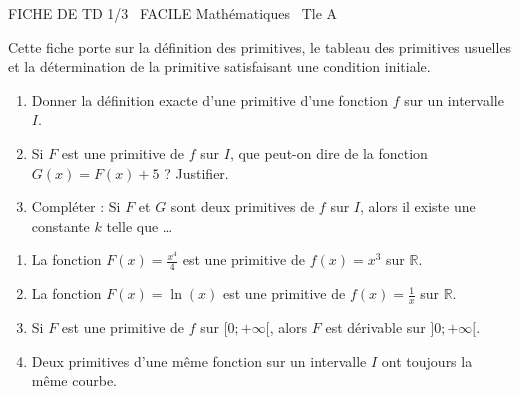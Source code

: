 \documentclass[11pt]{article}
\begin{document}
\begin{tcolorbox}[enhanced,colback=popink,colframe=popink,arc=10pt,boxrule=0pt,left=12pt,right=12pt,top=9pt,bottom=9pt]
{\color{white}\popxbold\small FICHE DE TD 1/3 \textbullet\ FACILE \hfill Mathématiques \textbullet\ Tle A\par}
\end{tcolorbox}
\vspace{4pt}
\noindent Cette fiche porte sur la définition des primitives, le tableau des primitives usuelles et la détermination de la primitive satisfaisant une condition initiale.

\begin{exercice}
\begin{enumerate}
    \item Donner la définition exacte d'une primitive d'une fonction $f$ sur un intervalle $I$.
    \item Si $F$ est une primitive de $f$ sur $I$, que peut-on dire de la fonction $G(x) = F(x) + 5$ ? Justifier.
    \item Compléter : Si $F$ et $G$ sont deux primitives de $f$ sur $I$, alors il existe une constante $k$ telle que \dots
\end{enumerate}
\end{exercice}

\begin{exercice}
\begin{enumerate}
    \item La fonction $F(x) = \frac{x^4}{4}$ est une primitive de $f(x) = x^3$ sur $\mathbb{R}$.
    \item La fonction $F(x) = \ln(x)$ est une primitive de $f(x) = \frac{1}{x}$ sur $\mathbb{R}$.
    \item Si $F$ est une primitive de $f$ sur $[0; +\infty[$, alors $F$ est dérivable sur $]0; +\infty[$.
    \item Deux primitives d'une même fonction sur un intervalle $I$ ont toujours la même courbe.
\end{enumerate}
\end{exercice}
\end{document}
